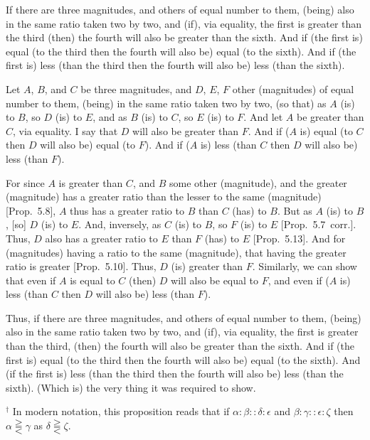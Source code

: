 \begin{Parallel}{}{}
{If there are three magnitudes, and others of equal
 number to them,   (being) also in the same ratio taken two by two, and (if),
via equality,  the first is greater
than the third (then) the fourth will also be greater than the sixth. And
 if (the first is) equal (to the third then the fourth will also be) equal
(to the sixth). 
And if (the first is) less (than the third then the fourth will also be) less (than
the sixth).

\epsfysize=0.7in
\centerline{}

Let $A$, $B$, and $C$ be three magnitudes, and $D$, $E$, $F$ other (magnitudes) of equal
number to them, (being) in the same ratio taken two by two, (so that)
as $A$ (is) to $B$, so $D$ (is) to $E$, and as $B$ (is) to $C$, so $E$ (is) to $F$. And let $A$
be greater than $C$, via equality. I say that $D$ will also be greater
than $F$. And if ($A$ is) equal (to $C$ then $D$ will also be) equal (to $F$). And
if ($A$ is) less (than $C$ then $D$ will also be) less (than $F$).

For since $A$ is greater than $C$, and $B$ some other (magnitude), and
the greater (magnitude) has a greater ratio than the lesser to the same (magnitude) [Prop.~5.8], $A$ thus has
a greater ratio to $B$ than $C$ (has) to $B$. But as $A$ (is) to $B$, [so] $D$ (is)
to $E$. And, inversely, as $C$ (is) to $B$,  so  $F$ (is) to $E$ [Prop.~5.7~corr.]. Thus, $D$ also has a greater
ratio to $E$ than $F$ (has) to $E$ [Prop.~5.13]. And for (magnitudes) having a ratio to the
same (magnitude), that having the greater ratio is greater [Prop.~5.10]. Thus, $D$ (is) greater than $F$.
Similarly, we can show that even if $A$ is equal to $C$ (then) $D$ will also
be equal to $F$, and even if ($A$ is) less (than $C$ then $D$ will also
be) less (than $F$).

Thus, if there are three magnitudes, and others of equal
number to them,   (being) also in the same ratio taken two by two, and (if),
via equality, the first is greater
than the third, (then) the fourth will also be greater than the sixth. And
 if (the first is) equal (to the third then the fourth will also be) equal
(to the sixth). And (if the first is) less (than the third then the fourth will also be) less (than
the sixth). (Which is) the very thing it was required to show.}
\end{Parallel}
{\footnotesize \noindent$^\dag$ In modern notation, this proposition
reads that if $\alpha:\beta::\delta:\epsilon$ and $\beta:\gamma::\epsilon:\zeta$ then $\alpha\gtreqqless\gamma$ as $\delta\gtreqqless\zeta$.}

